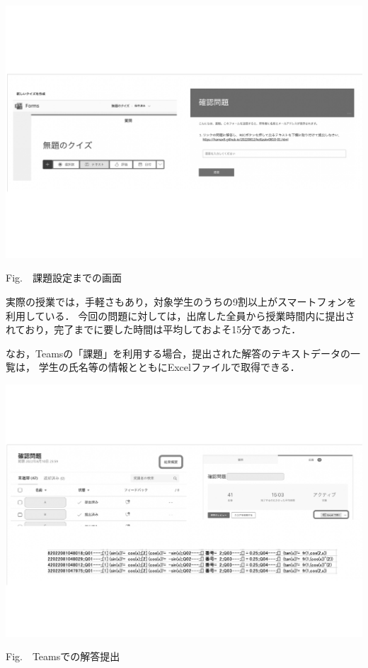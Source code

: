 \documentclass[a4j,12pt]{ujarticle}
\begin{document}
\begin{center}
\includegraphics[bb=1.44 182.88 841.68 416.10,width=150mm]{fig/teams2bw.pdf}

\addtocounter{figure}{1}Fig.\thefigure\ \ 課題設定までの画面
\end{center}

\vspace{-1mm}

実際の授業では，手軽さもあり，対象学生のうちの9割以上がスマートフォンを利用している．
今回の問題に対しては，出席した全員から授業時間内に提出されており，完了までに要した時間は平均しておよそ15分であった．

なお，Teamsの「課題」を利用する場合，提出された解答のテキストデータの一覧は，
学生の氏名等の情報とともにExcelファイルで取得できる．

\begin{center}
\includegraphics[bb=1.60 139.03 841.68 449.89,width=150mm]{fig/teams3bw.pdf}\\
\addtocounter{figure}{1}Fig.\thefigure\ \ Teamsでの解答提出
\end{center}
\end{document}
